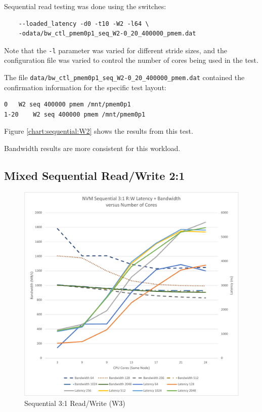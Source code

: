 Sequential read testing was done using the switches:

\begin{verbatim}
    --loaded_latency -d0 -t10 -W2 -l64 \
    -odata/bw_ctl_pmem0p1_seq_W2-0_20_400000_pmem.dat
\end{verbatim}

Note that the \verb+-l+ parameter was varied for different
stride sizes, and the configuration file was varied to control
the number of cores being used in the test.

The file \verb+data/bw_ctl_pmem0p1_seq_W2-0_20_400000_pmem.dat+ contained the confirmation information
for the specific test layout:

\begin{verbatim}
0	W2 seq 400000 pmem /mnt/pmem0p1
1-20	W2 seq 400000 pmem /mnt/pmem0p1
\end{verbatim}

Figure \ref{chart:sequential:W2} shows the results from this test.

Bandwidth results are more consistent for this workload.

\subsection{Mixed Sequential Read/Write 2:1}

\begin{figure}
    {\centering
    \caption{Sequential 3:1 Read/Write (W3)}\label{chart:sequential:w3}
    \includegraphics[scale=0.5]{charts/sequential-w3-crop.pdf}
    }
\end{figure}

